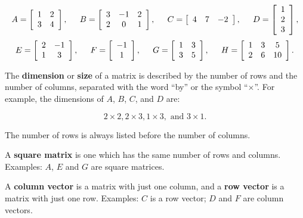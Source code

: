 \documentclass[12pt]{article}
\begin{document}
\[
 A =  \left[ \begin{array}{cc}  1 & 2 \\ 3 & 4  \end{array} \right],
 \hspace{.2in}
 B =  \left[ \begin{array}{ccc}  3 & -1 & 2 \\ 2 & 0 & 1  \end{array} \right],
 \hspace{.2in}
 C =  \left[ \begin{array}{ccc}  4 & 7 & -2   \end{array} \right],
 \hspace{.2in}
 D =  \left[ \begin{array}{c}  1 \\ 2 \\ 3 \end{array} \right],
 \]
 \[
 E =  \left[ \begin{array}{cc}  2 & -1 \\ 1 & 3 \end{array} \right],
 \hspace{.2in}
 F =  \left[ \begin{array}{c}  -1 \\ 1 \end{array} \right],
 \hspace{.2in}
 G =  \left[ \begin{array}{cc}  1 & 3 \\ 3 & 5 \end{array} \right],
 \hspace{.2in}
 H =  \left[ \begin{array}{ccc}  1 & 3 & 5 \\ 2 & 6 & 10  \end{array} \right].
 \]

The {\bf dimension} or {\bf size} of a matrix
is described by the number of rows and the number
of columns, separated with the word ``by'' or the symbol ``$\times$''.  For example,
the dimensions of $A$, $B$, $C$, and $D$ are:

$$ 2 \times 2, 2 \times 3, 1 \times 3, {\mbox{ and }} 3 \times 1. $$

The number of rows is always listed before the number of columns.

A {\bf square matrix} is one which has the same number of rows and columns.
Examples: $A$, $E$ and $G$ are square matrices.

A {\bf column vector} is a matrix with just one column, and a {\bf row vector}
is a matrix with just one row. Examples: $C$ is a row vector; $D$ and
$F$ are column vectors.
\end{document}
